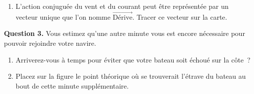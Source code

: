 \documentclass[11pt,a4paper]{article}
\newcommand{\Jtag}{\par\vspace{2pt}{\raggedleft\scriptsize\itshape\color{jimmycolor}Fiches Jimmy\par}}
\begin{document}
\begin{tcolorbox}[boxrule=0.8pt,colframe=black,colback=white,arc=2pt,left=6pt,right=6pt,top=5pt,bottom=5pt]
\begin{enumerate}
\item[b.] L'action conjugu\'ee du vent et du courant peut \^etre repr\'esent\'ee par un vecteur unique que l'on nomme $\overrightarrow{\text{D\'erive}}$. Tracer ce vecteur sur la carte.
\end{enumerate}
\textbf{Question 3.} Vous estimez qu'une autre minute vous est encore n\'ecessaire pour pouvoir rejoindre votre navire.
\begin{enumerate}
\item[a.] Arriverez-vous \`a temps pour \'eviter que votre bateau soit \'echou\'e sur la c\^ote~?
\item[b.] Placez sur la figure le point th\'eorique o\`u se trouverait l'\'etrave du bateau au bout de cette minute suppl\'ementaire.
\end{enumerate}
\Jtag
\end{tcolorbox}
\vspace{10pt}\par
\end{document}
